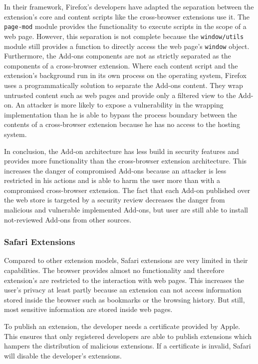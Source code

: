 	In their framework, Firefox's developers have adapted the separation between the extension's core and content scripts like the cross-browser extensions use it. The \texttt{page-mod} module provides the functionality to execute scripts in the scope of a web page. However, this separation is not complete because the \texttt{window/utils} module still provides a function to directly access the web page's \texttt{window} object.  \\
	Furthermore, the Add-ons components are not as strictly separated as the components of a cross-browser extension. Where each content script and the extension's background run in its own process on the operating system, Firefox uses a programmatically solution to separate the Add-ons content. They wrap untrusted content such as web pages and provide only a filtered view to the Add-on. An attacker is more likely to expose a vulnerability in the wrapping implementation than he is able to bypass the process boundary between the contents of a cross-browser extension because he has no access to the hosting system.
	
	In conclusion, the Add-on architecture has less build in security features and provides more functionality than the cross-browser extension architecture. This increases the danger of compromised Add-ons because an attacker is less restricted in his actions and is able to harm the user more than with a compromised cross-browser extension. The fact that each Add-on published over the web store is targeted by a security review decreases the danger from malicious and vulnerable implemented Add-ons, but user are still able to install not-reviewed Add-ons from other sources. 
	
\subsubsection{Safari Extensions}

	Compared to other extension models, Safari extensions are very limited in their capabilities. The browser provides almost no functionality and therefore extension's are restricted to the interaction with web pages. This increases the user's privacy at least partly because an extension can not access information stored inside the browser such as bookmarks or the browsing history. But still, most sensitive information are stored inside web pages. 
	
	To publish an extension, the developer needs a certificate provided by Apple. This ensures that only registered developers are able to publish extensions which hampers the distribution of malicious extensions. If a certificate is invalid, Safari will disable the developer's extensions.
	
